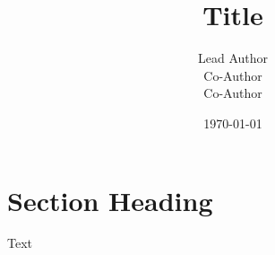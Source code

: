 \documentclass{stsci_report}
\title{\textbf{Title}}
\author{Lead Author\\
Co-Author\\
Co-Author}
\date{\today}
\begin{document}
\maketitle


\section{Section Heading}
Text

%

\end{document}
